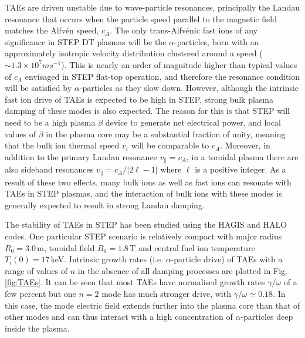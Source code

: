 \documentclass[10pt, a4paper, twoside]{article}
\begin{document}
TAEs are driven unstable due to wave-particle resonances, principally the Landau resonance that occurs when the particle speed parallel to the magnetic field matches the Alfv\'en speed, $c_A$. The only trans-Alfv\'enic fast ions of any significance in STEP DT plasmas will be the $\alpha$-particles, born with an approximately isotropic velocity distribution clustered around a speed ($\sim 1.3\times10^7\si{ms^{-1}}$). This is nearly an order of magnitude higher than typical values of $c_A$ envisaged in STEP flat-top operation, and therefore the resonance condition will be satisfied by $\alpha$-particles as they slow down. However, although the intrinsic fast ion drive of TAEs is expected to be high in STEP, strong bulk plasma damping of these modes is also expected. The reason for this is that STEP will need to be a high plasma $\beta$ device to generate net electrical power, and local values of $\beta$ in the plasma core may be a substantial fraction of unity, meaning that the bulk ion thermal speed $v_i$ will be comparable to $c_A$. Moreover, in addition to the primary Landau resonance $v_{\parallel}=c_A$, in a toroidal plasma there are also sideband resonances $v_{\parallel} = c_A/\vert 2\ell-1 \vert$ where $\ell$ is a positive integer. As a result of these two effects, many bulk ions as well as fast ions can resonate with TAEs in STEP plasmas, and the interaction of bulk ions with these modes is generally expected to result in strong Landau damping.

The stability of TAEs in STEP has been studied using the HAGIS \cite{pinches1998} and HALO \cite{fitzgerald2020} codes. One particular STEP scenario is relatively compact with major radius $R_0 = 3.0\,$m, toroidal field $B_0 = 1.8\,$T and central fuel ion temperature $T_i(0)=17\,$keV. Intrinsic growth rates (i.e. $\alpha$-particle drive) of TAEs with a range of values of $n$ in the absence of all damping processes are plotted in Fig. \ref{fig:TAEs}. It can be seen that most TAEs have normalised growth rates $\gamma/\omega$ of a few percent but one $n=2$ mode has much stronger drive, with $\gamma/\omega \simeq 0.18$. In this case, the mode electric field extends further into the plasma core than that of other modes and can thus interact with a high concentration of $\alpha$-particles deep inside the plasma. 
\end{document}
